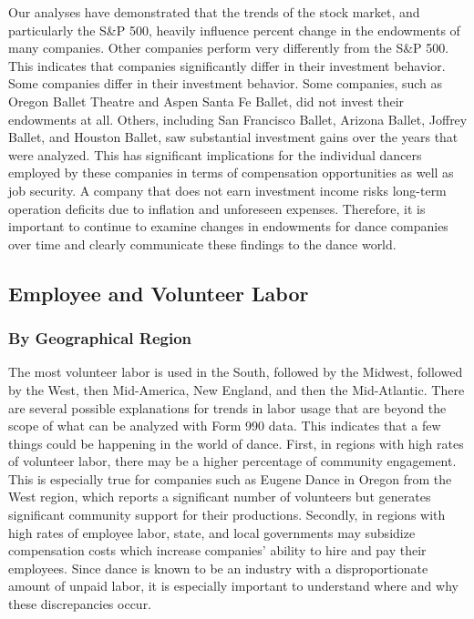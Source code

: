 \documentclass[Dance Data
Project,article,submit,moreauthors,pdftex]{mdpi}
\begin{document}
Our analyses have demonstrated that the trends of the stock market, and
particularly the S\&P 500, heavily influence percent change in the
endowments of many companies. Other companies perform very differently
from the S\&P 500. This indicates that companies significantly differ in
their investment behavior. Some companies differ in their investment
behavior. Some companies, such as Oregon Ballet Theatre and Aspen Santa
Fe Ballet, did not invest their endowments at all. Others, including San
Francisco Ballet, Arizona Ballet, Joffrey Ballet, and Houston Ballet,
saw substantial investment gains over the years that were analyzed. This
has significant implications for the individual dancers employed by
these companies in terms of compensation opportunities as well as job
security. A company that does not earn investment income risks long-term
operation deficits due to inflation and unforeseen expenses. Therefore,
it is important to continue to examine changes in endowments for dance
companies over time and clearly communicate these findings to the dance
world.

\hypertarget{employee-and-volunteer-labor}{%
\subsection{Employee and Volunteer
Labor}\label{employee-and-volunteer-labor}}

\hypertarget{by-geographical-region}{%
\subsubsection{By Geographical Region}\label{by-geographical-region}}

The most volunteer labor is used in the South, followed by the Midwest,
followed by the West, then Mid-America, New England, and then the
Mid-Atlantic. There are several possible explanations for trends in
labor usage that are beyond the scope of what can be analyzed with Form
990 data. This indicates that a few things could be happening in the
world of dance. First, in regions with high rates of volunteer labor,
there may be a higher percentage of community engagement. This is
especially true for companies such as Eugene Dance in Oregon from the
West region, which reports a significant number of volunteers but
generates significant community support for their productions. Secondly,
in regions with high rates of employee labor, state, and local
governments may subsidize compensation costs which increase companies'
ability to hire and pay their employees. Since dance is known to be an
industry with a disproportionate amount of unpaid labor, it is
especially important to understand where and why these discrepancies
occur.
\end{document}
